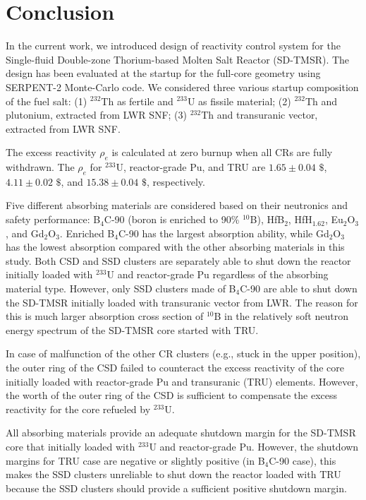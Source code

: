 \section{Conclusion} \label{Conclusion}
In the current work, we introduced design of reactivity control system for the 
Single-fluid Double-zone Thorium-based Molten Salt Reactor (SD-TMSR). The 
design has been evaluated at the startup for the full-core geometry using 
SERPENT-2 Monte-Carlo code. We considered three various startup composition of 
the fuel salt: (1) $^{232}$Th as fertile and $^{233}$U as fissile material; 
(2) $^{232}$Th and plutonium, extracted from \gls{LWR} \gls{SNF}; (3) 
$^{232}$Th and transuranic vector, extracted from \gls{LWR} \gls{SNF}.

The excess reactivity $\rho_e$ is calculated at zero burnup when all CRs are 
fully withdrawn. The $\rho_e$ for $^{233}$U, reactor-grade Pu, and 
TRU are $1.65\pm0.04$ $\$$, $4.11\pm0.02$ $\$$, and $15.38\pm0.04$ $\$$, 
respectively.

Five different absorbing materials are considered based on their neutronics and 
safety performance: B$_4$C-90 (boron is enriched to 90\% $^{10}$B), HfB$_2$, 
HfH$_{1.62}$, Eu$_2$O$_3$, and Gd$_2$O$_3$. Enriched B$_4$C-90 has the largest 
absorption ability, while Gd$_2$O$_3$ has the lowest absorption compared with 
the other absorbing materials in this study. Both CSD and SSD clusters are 
separately able to shut down the reactor initially loaded with $^{233}$U and 
reactor-grade Pu regardless of the absorbing material type. However, only SSD 
clusters made of B$_4$C-90 are able to shut down the SD-TMSR initially loaded 
with transuranic vector from \gls{LWR}. The reason for this is much larger 
absorption cross section of $^{10}$B in the relatively soft neutron energy 
spectrum of the SD-TMSR core started with TRU.

In case of malfunction of the other CR clusters (e.g., stuck in the upper 
position), the outer ring of the CSD failed to counteract the excess 
reactivity of the core initially loaded with reactor-grade Pu and transuranic 
(TRU) elements. However, the worth of the outer ring of the CSD is sufficient 
to compensate the excess reactivity for the core refueled by $^{233}$U.

All absorbing materials provide an adequate shutdown margin for the SD-TMSR 
core that initially loaded with $^{233}$U and reactor-grade Pu. However, the 
shutdown margins for TRU case are negative or slightly positive (in B$_4$C-90 
case), this makes the SSD clusters unreliable to shut down the reactor loaded 
with TRU because the SSD clusters should provide a sufficient positive shutdown margin.

